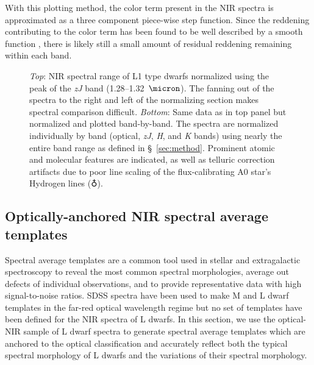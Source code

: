 \documentclass[modern]{aastex61}
\begin{document}
With this plotting method, the color term present in the NIR spectra is approximated as a three component piece-wise step function.
Since the reddening contributing to the color term has been found to be well described by a smooth function \citep{Marocco:2014kr,Hiranaka:2016jm}, there is likely still a small amount of residual reddening remaining within each band.

\begin{figure}
  \caption{\emph{Top}: NIR spectral range of L1 type dwarfs normalized using the peak of the \emph{zJ} band (1.28--1.32~$\micron$). The fanning out of the spectra to the right and left of the normalizing section makes spectral comparison difficult.
    \emph{Bottom}: Same data as in top panel but normalized and plotted band-by-band. The spectra are normalized individually by band (optical, \emph{zJ}, \emph{H}, and \emph{K} bands) using nearly the entire band range as defined in \S~\ref{sec:method}. Prominent atomic and molecular features are indicated, as well as telluric correction artifacts due to poor line scaling of the  flux-calibrating A0 star's Hydrogen lines ($\earth$).}
  \label{fig:L1fan}
\end{figure}

\subsection{Optically-anchored NIR spectral average templates}
\label{sec:templates}

Spectral average templates are a common tool used in stellar and extragalactic spectroscopy to reveal the most common spectral morphologies, average out defects of individual observations, and to provide representative data with high signal-to-noise ratios.
SDSS spectra have been used to make M and L dwarf templates in the far-red optical wavelength regime \citep{Bochanski07_templates, Schmidt:2014jc} but no set of templates have been defined for the NIR spectra of L dwarfs.
In this section, we use the optical-NIR sample of L dwarf spectra to generate spectral average templates which are anchored to the optical classification and accurately reflect both the typical spectral morphology of L dwarfs and the variations of their spectral morphology.
\end{document}

